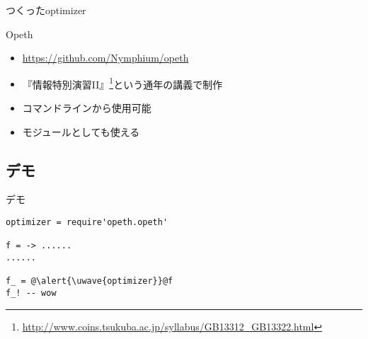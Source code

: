 \begin{frame}
	\frametitlesec
	つくったoptimizer

	\begin{center}{\theking{}Opeth\par}\end{center}
	\begin{itemize}
		\item \url{https://github.com/Nymphium/opeth}
		\item 『情報特別演習II』\footnote{\url{http://www.coins.tsukuba.ac.jp/syllabus/GB13312_GB13322.html}}という通年の講義で制作
		\item コマンドラインから使用可能
		\item モジュールとしても使える
	\end{itemize}
\end{frame}
\skipnexttoc
\subsection{デモ}
\begin{frame}[fragile]
\begin{center}\Huge{}デモ\end{center}
\end{frame}
\skipnexttoc
\begin{frame}[fragile]
	\frametitlesubs

	\begin{lstlisting}[language=MoonScript,numbers=none,escapechar=@]
optimizer = require'opeth.opeth'

f = -> ......
......

f_ = @\alert{\uwave{optimizer}}@f
f_! -- wow
	\end{lstlisting}
\end{frame}
